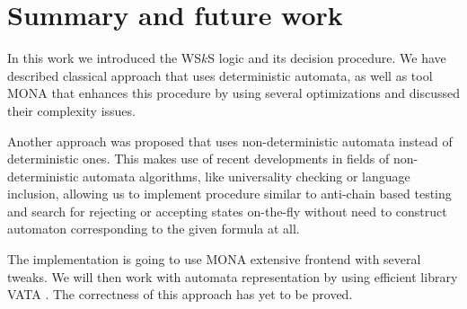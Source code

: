 \chapter{Summary and future work}\label{summary}

In this work we introduced the WS$k$S logic and its decision procedure. We have
described classical approach that uses deterministic automata, as well as tool
\textsc{MONA} that enhances this procedure by using several optimizations and
discussed their complexity issues.

Another approach was proposed that uses non-deterministic automata instead of
deterministic ones. This makes use of recent developments in fields of
non-deterministic automata algorithms, like universality checking or language
inclusion, allowing us to implement procedure similar to anti-chain based
testing \cite{tacas} and search for rejecting or accepting states on-the-fly
without need to construct automaton corresponding to the given formula at all.

The implementation is going to use \textsc{MONA} extensive frontend with several
tweaks. We will then work with automata representation by using efficient
library \textsc{VATA} \cite{vata}. The correctness of this approach has yet to
be proved.

